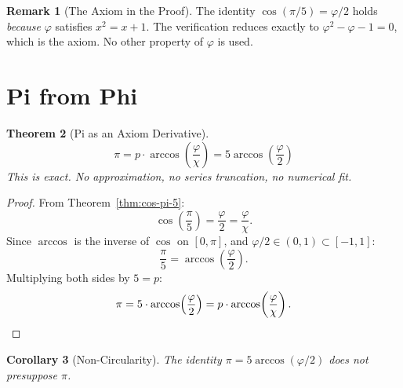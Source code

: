 \documentclass[11pt,a4paper]{article}
\theoremstyle{plain}
\newtheorem{theorem}{Theorem}[section]
\newtheorem{corollary}[theorem]{Corollary}
\theoremstyle{definition}
\newtheorem{remark}[theorem]{Remark}
\begin{document}
\begin{remark}[The Axiom in the Proof]\label{rem:axiom-link}
The identity $\cos(\pi/5) = \varphi/2$ holds \emph{because}
$\varphi$ satisfies $x^2 = x + 1$.
The verification reduces exactly to
$\varphi^2 - \varphi - 1 = 0$, which is the axiom.
No other property of $\varphi$ is used.
\end{remark}

\section{Pi from Phi}\label{sec:pi-from-phi}

\begin{theorem}[Pi as an Axiom Derivative]\label{thm:pi-exact}
\begin{equation}\label{eq:pi-exact}
  \boxed{\; \pi = p \cdot \arccos\!\left(\frac{\varphi}{\chi}\right)
  = 5\arccos\!\left(\frac{\varphi}{2}\right) \;}
\end{equation}
This is exact. No approximation, no series truncation, no numerical fit.
\end{theorem}

\begin{proof}
From Theorem~\ref{thm:cos-pi-5}:
\[
  \cos\!\left(\frac{\pi}{5}\right) = \frac{\varphi}{2} = \frac{\varphi}{\chi}.
\]
Since $\arccos$ is the inverse of $\cos$ on $[0, \pi]$, and
$\varphi/2 \in (0, 1) \subset [-1, 1]$:
\[
  \frac{\pi}{5} = \arccos\!\left(\frac{\varphi}{2}\right).
\]
Multiplying both sides by $5 = p$:
\[
  \pi = 5 \cdot \arccos\!\left(\frac{\varphi}{2}\right)
  = p \cdot \arccos\!\left(\frac{\varphi}{\chi}\right). \qedhere
\]
\end{proof}

\begin{corollary}[Non-Circularity]\label{cor:noncircular}
The identity $\pi = 5\arccos(\varphi/2)$ does not presuppose $\pi$.
\end{corollary}
\end{document}
